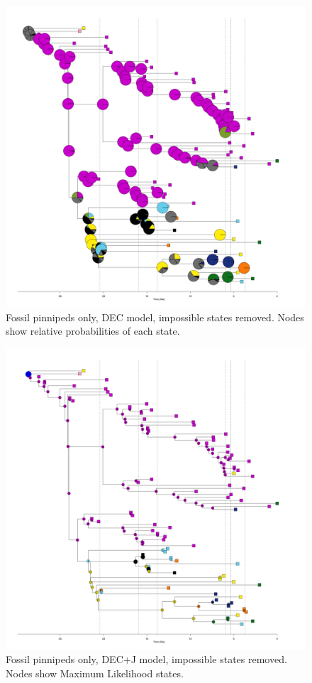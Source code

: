 \documentclass[a4paper, 12pt]{article}
\begin{document}
\begin{figure}[H]
 \centering
  \includegraphics[width = \linewidth]{figures/fossil-pinnipeds-DEC-impossible-pies.png}
  \caption{Fossil pinnipeds only, DEC model, impossible states removed. Nodes show relative probabilities of each state.}
  \label{fig-fossil-dec-pie}
\end{figure} 

\begin{figure}[H]
 \centering
  \includegraphics[width = \linewidth]{figures/fossil-pinnipeds-DECj-impossible-MLstates.png}
  \caption{Fossil pinnipeds only, DEC+J model, impossible states removed. Nodes show Maximum Likelihood states.}
  \label{fig-fossil-decj-ml}
\end{figure} 
\end{document}
